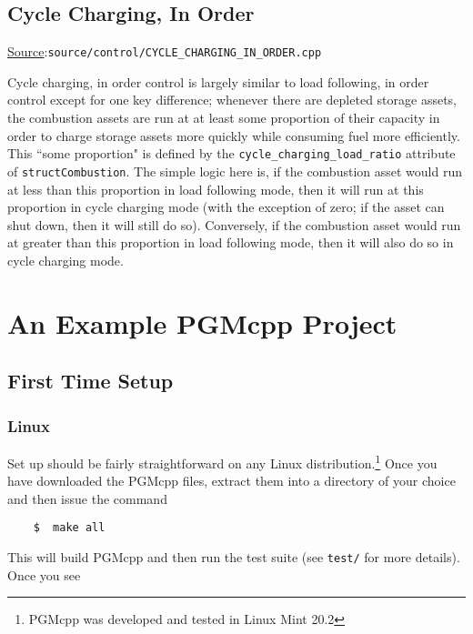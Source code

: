\documentclass[12pt, letterpaper]{report}
\begin{document}
\section{Cycle Charging, In Order}

\begin{large}
\noindent\underline{Source}:\quad\texttt{source/control/CYCLE\_CHARGING\_IN\_ORDER.cpp}\par
\end{large}
\vspace{5mm}

Cycle charging, in order control is largely similar to load following, in order control except for one key difference; whenever there are depleted storage assets, the combustion assets are run at at least some proportion of their capacity in order to charge storage assets more quickly while consuming fuel more efficiently. This ``some proportion" is defined by the \texttt{cycle\_charging\_load\_ratio} attribute of \texttt{structCombustion}. The simple logic here is, if the combustion asset would run at less than this proportion in load following mode, then it will run at this proportion in cycle charging mode (with the exception of zero; if the asset can shut down, then it will still do so). Conversely, if the combustion asset would run at greater than this proportion in load following mode, then it will also do so in cycle charging mode. 

\chapter{An Example PGMcpp Project}

\section{First Time Setup}

\subsection{Linux}

Set up should be fairly straightforward on any Linux distribution.\footnote{PGMcpp was developed and tested in Linux Mint 20.2} Once you have downloaded the PGMcpp files, extract them into a directory of your choice and then issue the command

\begin{verbatim}
    $  make all
\end{verbatim}

\noindent This will build PGMcpp and then run the test suite (see \texttt{test/} for more details). Once you see
\end{document}
